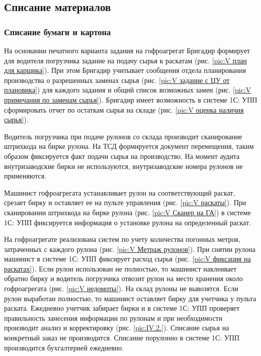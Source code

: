 \newpage
%
\subsection{Списание материалов}
\label{bp:MatOutput}

\subsubsection{Списание бумаги и картона}

 На основании печатного варианта задания на гофроагрегат Бригадир формирует для водителя погрузчика задание на подачу сырья к раскатам (рис. \ref{pic:V план для карщика}). При этом Бригадир учитывает сообщения отдела планирования производства о разрешенных заменах сырья (рис. \ref{pic:V задание с ЦУ от плановика}) для каждого задания и общий список возможных замен (рис. \ref{pic:V примечания по заменам сырья}). Бригадир имеет возможность в системе 1С: УПП сформировать отчет по остаткам сырья на складе (рис. \ref{pic:V оценка наличия сырья}).

Водитель погрузчика при подаче рулонов со склада производит сканирование штрихкода на бирке рулона. На ТСД формируется документ перемещения, таким образом фиксируется факт подачи сырья на производство. На момент аудита внутризаводские бирки не используются, внутризаводские номера рулонов не применяются.

Машинист гофроагрегата устанавливает рулон на соответствующий раскат, срезает бирку и оставляет ее на пульте управления (рис. \ref{pic:V раскаты}). При сканировании штрихкода на бирке рулона (рис. \ref{pic:V Сканер на ГА}) в системе 1С: УПП фиксируется информация о установке рулона на определенный раскат.

На гофроагрегате  реализована систем по учету количества погонных метров, затраченных с каждого рулона (рис. \ref{pic:V Метраж рулонов}). При снятии рулона машинист в системе 1С: УПП фиксирует расход сырья (рис. \ref{pic:V фиксация на раскатах}). Если рулон использован не полностью, то машинист наклеивает обратно бирку и водитель погрузчика отвозит рулон на место хранения около гофроагрегата (рис. \ref{pic:V недомоты}). На склад рулоны не вывозятся. Если рулон выработан полностью, то машинист оставляет бирку для учетчика у пульта раската. 
 Ежедневно учетчик забирает бирки и в системе 1С: УПП проверяет правильность занесения информации по рулонам и при необходимости производит анализ и корректировку (рис. \ref{pic:IV.2.}).   
Списание сырья на конкретный заказ не производится. Списание порулонно в системе 1С: УПП производится бухгалтерией ежедневно. 

